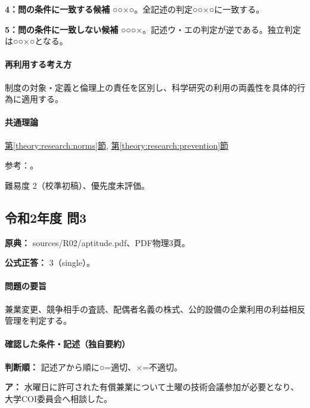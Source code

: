 \noindent\textbf{4：問の条件に一致する候補} ○○×○。全記述の判定○○×○に一致する。\par

\noindent\textbf{5：問の条件に一致しない候補} ○○○×。記述ウ・エの判定が逆である。独立判定は○○×○となる。\par

\paragraph{再利用する考え方} 制度の対象・定義と倫理上の責任を区別し、科学研究の利用の両義性を具体的行為に適用する。

\paragraph{共通理論} \hyperref[theory:research:norms]{第\ref*{theory:research:norms}節}, \hyperref[theory:research:prevention]{第\ref*{theory:research:prevention}節}

\par 参考：\cite{scj_code2013}。

\par 難易度 2（校準初稿）、優先度未評価。

\subsection{令和2年度 問3}
\label{q:r02-reg-apt-03}

\noindent\textbf{原典：} sources/R02/aptitude.pdf、PDF物理3頁。

\textbf{公式正答：} 3（single）。

\paragraph{問題の要旨} 兼業変更、競争相手の査読、配偶者名義の株式、公的設備の企業利用の利益相反管理を判定する。

\paragraph{確認した条件・記述（独自要約）}\mbox{}\par

\noindent\textbf{判断順：} 記述アから順に○=適切、×=不適切。\par

\noindent\textbf{ア：} 水曜日に許可された有償兼業について土曜の技術会議参加が必要となり、大学COI委員会へ相談した。\par

